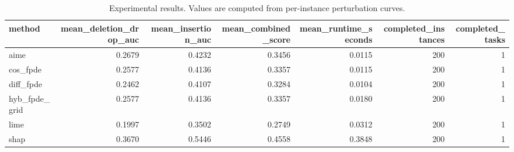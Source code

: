 \begin{table}[t]
\caption{Experimental results. Values are computed from per-instance perturbation curves.}
\label{tab:main_results_computed}
\centering
\begin{tabular}{lrrrrrr}
\toprule
method & mean\_deletion\_drop\_auc & mean\_insertion\_auc & mean\_combined\_score & mean\_runtime\_seconds & completed\_instances & completed\_tasks \\
\midrule
aime & 0.2679 & 0.4232 & 0.3456 & 0.0115 & 200 & 1 \\
cos\_fpde & 0.2577 & 0.4136 & 0.3357 & 0.0115 & 200 & 1 \\
diff\_fpde & 0.2462 & 0.4107 & 0.3284 & 0.0104 & 200 & 1 \\
hyb\_fpde\_grid & 0.2577 & 0.4136 & 0.3357 & 0.0180 & 200 & 1 \\
lime & 0.1997 & 0.3502 & 0.2749 & 0.0312 & 200 & 1 \\
shap & 0.3670 & 0.5446 & 0.4558 & 0.3848 & 200 & 1 \\
\bottomrule
\end{tabular}

\end{table}

